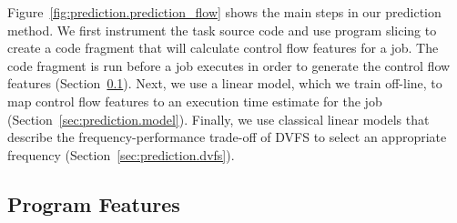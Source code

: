 Figure~\ref{fig:prediction.prediction_flow} shows the main steps in our
prediction method. We first instrument the task source code and use program
slicing to create a code fragment that will
calculate control flow features for a job. The code fragment is run before a
job executes in order to generate the control flow features
(Section~\ref{sec:prediction.features}). Next, we use a linear model, which we train off-line, to map
control flow features to an execution time estimate for the job 
(Section~\ref{sec:prediction.model}). Finally, we use classical linear models \cite{xie-pldi03, wu-micro05}
that describe the frequency-performance trade-off of DVFS to select an
appropriate frequency (Section~\ref{sec:prediction.dvfs}).

\subsection{Program Features}
\label{sec:prediction.features}

